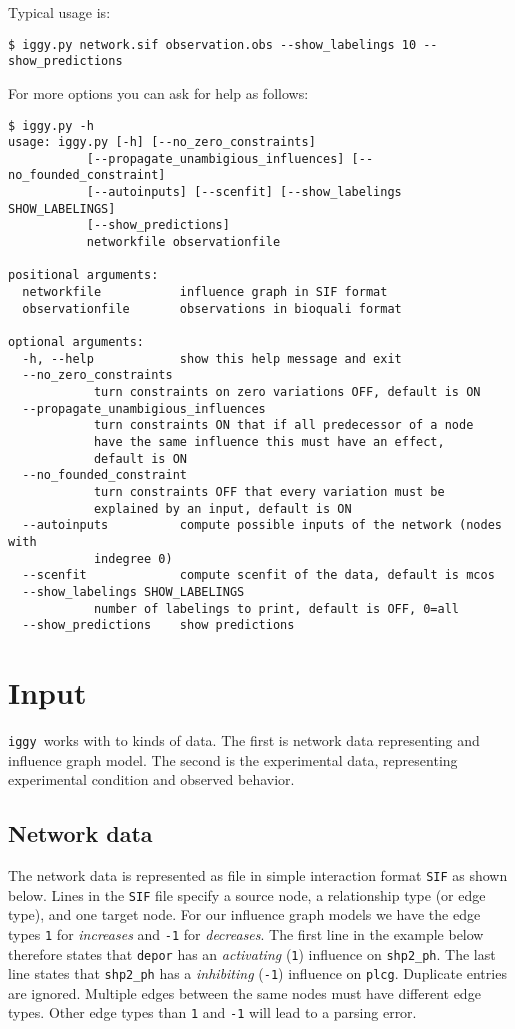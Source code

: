 \documentclass{article}
\newcommand\iggy{\texttt{iggy}}
\begin{document}
Typical usage is:
\begin{Verbatim}[frame=single]
$ iggy.py network.sif observation.obs --show_labelings 10 --show_predictions
\end{Verbatim}
For more options you can ask for help as follows:
\begin{Verbatim}[frame=single]
$ iggy.py -h        
usage: iggy.py [-h] [--no_zero_constraints]
           [--propagate_unambigious_influences] [--no_founded_constraint]
           [--autoinputs] [--scenfit] [--show_labelings SHOW_LABELINGS]
           [--show_predictions]
           networkfile observationfile

positional arguments:
  networkfile           influence graph in SIF format
  observationfile       observations in bioquali format

optional arguments:
  -h, --help            show this help message and exit
  --no_zero_constraints
            turn constraints on zero variations OFF, default is ON
  --propagate_unambigious_influences
            turn constraints ON that if all predecessor of a node
            have the same influence this must have an effect,
            default is ON
  --no_founded_constraint
            turn constraints OFF that every variation must be
            explained by an input, default is ON
  --autoinputs          compute possible inputs of the network (nodes with
            indegree 0)
  --scenfit             compute scenfit of the data, default is mcos
  --show_labelings SHOW_LABELINGS
            number of labelings to print, default is OFF, 0=all
  --show_predictions    show predictions
\end{Verbatim} 


\section{Input}

\iggy\ works with to kinds of data. 
The first is network data representing and influence graph model. 
The second is the experimental data, representing experimental condition and observed behavior.


\subsection{Network data}

The network data is represented as file in simple interaction format \texttt{SIF} as shown below.
Lines in the \texttt{SIF} file specify a source node, a relationship type (or edge type), and one target node.
For our influence graph models we have the edge types 
\texttt{1} for \emph{increases} 
and \texttt{-1} for \emph{decreases}.
The first line in the example below therefore states that
 \texttt{depor} has an \emph{activating} (\texttt{1}) influence on \texttt{shp2\_ph}.
The last line states that  \texttt{shp2\_ph} has a \emph{inhibiting} (\texttt{-1}) influence on \texttt{plcg}.
Duplicate entries are ignored. 
Multiple edges between the same nodes must have different edge types. 
Other edge types than \texttt{1} and \texttt{-1} will lead to a parsing error.
\end{document}
